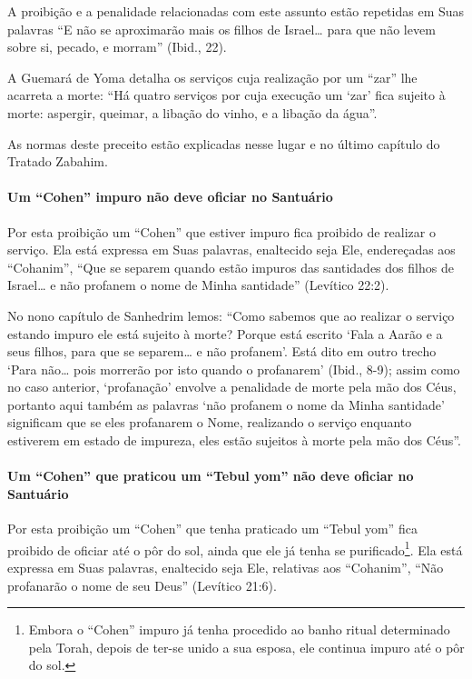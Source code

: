 A proibição e a penalidade relacionadas com este assunto estão repetidas
em Suas palavras ``E não se aproximarão mais os filhos de Israel\ldots{} para
que não levem sobre si, pecado, e morram'' (Ibid., 22).

A Guemará de Yoma detalha os serviços cuja realização por um ``zar'' lhe
acarreta a morte: ``Há quatro serviços por cuja execução um `zar' fica
sujeito à morte: aspergir, queimar, a libação do vinho, e a libação da
água''.

As normas deste preceito estão explicadas nesse lugar e no último
capítulo do Tratado Zabahim.


\paragraph{Um ``Cohen'' impuro não deve oficiar no Santuário}

Por esta proibição um ``Cohen'' que estiver impuro fica proibido de
realizar o serviço. Ela está expressa em Suas palavras, enaltecido seja
Ele, endereçadas aos ``Cohanim'', ``Que se separem quando estão impuros
das santidades dos filhos de Israel\ldots{} e não profanem o nome de Minha
santidade'' (Levítico 22:2).

No nono capítulo de Sanhedrim lemos: ``Como sabemos que ao realizar o
serviço estando impuro ele está sujeito à morte? Porque está escrito
`Fala a Aarão e a seus filhos, para que se separem\ldots{} e não profanem'.
Está dito em outro trecho `Para não\ldots{} pois morrerão por isto quando o
profanarem' (Ibid., 8-9); assim como no caso anterior, `profanação'
envolve a penalidade de morte pela mão dos Céus, portanto aqui também as
palavras `não profanem o nome da Minha santidade' significam que se eles
profanarem o Nome, realizando o serviço enquanto estiverem em estado de
impureza, eles estão sujeitos à morte pela mão dos Céus''.

\paragraph{Um ``Cohen'' que praticou um ``Tebul yom'' não deve oficiar no
Santuário}

Por esta proibição um ``Cohen'' que tenha praticado um ``Tebul yom''
fica proibido de oficiar até o pôr do sol, ainda que ele já tenha se
purificado\footnote{Embora o ``Cohen'' impuro já tenha procedido ao banho ritual
determinado pela Torah, depois de ter-se unido a sua esposa, ele
continua impuro até o pôr do sol.}. Ela está expressa em Suas palavras,
enaltecido seja Ele, relativas aos ``Cohanim'', ``Não profanarão o nome
de seu Deus'' (Levítico 21:6).

